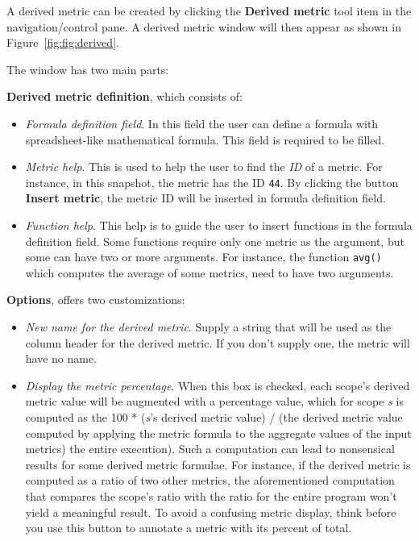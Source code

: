 A derived metric can be created by clicking the \textbf{Derived metric} tool item in the navigation/control pane.
A derived metric window will then appear as shown in Figure~\ref{fig:fig:derived}.


The window has two main parts:

\textbf{Derived metric definition}, which consists of:
\begin{itemize}

\item \textit{Formula definition field}.
In this field the user can define a formula with spreadsheet-like mathematical formula.
This field is required to be filled.

\item \textit{Metric help}.
This is used to help the user to find the \textit{ID} of a metric.
For instance, in this snapshot, the metric  has the ID \texttt{44}.
By clicking the button \textbf{Insert metric}, the metric ID will be inserted in formula definition field.

\item \textit{Function help}. This help is to guide the user to insert functions in the formula definition field. Some functions require only one metric as the argument, but some can have two or more arguments. For instance, the function
\texttt{avg()} which computes the average of some metrics, need to have two arguments.
\end{itemize}

\textbf{Options}, offers two customizations:
\begin{itemize}

\item \textit{New name for the derived metric}.
Supply a string that will be used as the column header for the derived metric.
If you don't supply one, the metric will have no name.

\item \textit{Display the metric percentage}.
When this box is checked, each scope's derived metric value will be augmented with a percentage value, which for scope \textit{s} is computed as the 100 * (\textit{s}'s derived metric value) / (the derived metric value computed by applying the metric formula to the aggregate values of the input metrics) the entire execution).
Such a computation can lead to nonsensical results for some derived metric formulae.
For instance, if the derived metric is computed as a ratio of two other metrics, the aforementioned computation that compares the scope's ratio with the ratio for the entire program won't yield a meaningful result.
To avoid a confusing metric display, think before you use this button to annotate a metric with its percent of total.
\end{itemize}


